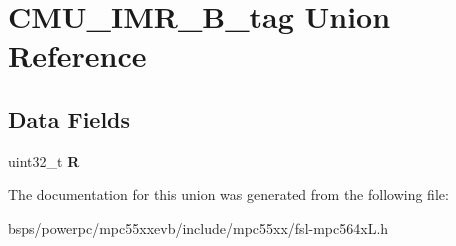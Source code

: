\hypertarget{unionCMU__IMR__32B__tag}{}\section{C\+M\+U\+\_\+\+I\+M\+R\+\_\+B\+\_\+tag Union Reference}
\label{unionCMU__IMR__32B__tag}
\subsection*{Data Fields}
\begin{DoxyCompactItemize}
\item 
\mbox{\label{unionCMU__IMR__32B__tag_a39ae094cc044cece61bdfacc1021f4b4}} 
uint32\+\_\+t {\bfseries R}
\end{DoxyCompactItemize}


The documentation for this union was generated from the following file\+:\begin{DoxyCompactItemize}
\item 
bsps/powerpc/mpc55xxevb/include/mpc55xx/fsl-\/mpc564x\+L.\+h\end{DoxyCompactItemize}
